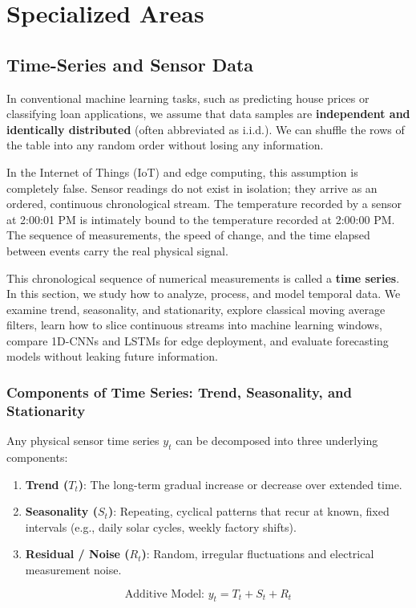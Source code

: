\chapter{Specialized Areas}\label{ch:specialized_areas}
\section{Time-Series and Sensor Data}\label{sec:time_series}

In conventional machine learning tasks, such as predicting house prices or classifying loan applications, we assume that data samples are \textbf{independent and identically distributed} (often abbreviated as i.i.d.). We can shuffle the rows of the table into any random order without losing any information.

In the Internet of Things (IoT) and edge computing, this assumption is completely false. Sensor readings do not exist in isolation; they arrive as an ordered, continuous chronological stream. The temperature recorded by a sensor at 2:00:01 PM is intimately bound to the temperature recorded at 2:00:00 PM. The sequence of measurements, the speed of change, and the time elapsed between events carry the real physical signal.

This chronological sequence of numerical measurements is called a \textbf{time series}. In this section, we study how to analyze, process, and model temporal data. We examine trend, seasonality, and stationarity, explore classical moving average filters, learn how to slice continuous streams into machine learning windows, compare 1D-CNNs and LSTMs for edge deployment, and evaluate forecasting models without leaking future information.

\subsection{Components of Time Series: Trend, Seasonality, and Stationarity}

\begin{keyidea}
Any physical sensor time series $y_t$ can be decomposed into three underlying components:
\begin{enumerate}
    \item \textbf{Trend ($T_t$)}: The long-term gradual increase or decrease over extended time.
    \item \textbf{Seasonality ($S_t$)}: Repeating, cyclical patterns that recur at known, fixed intervals (e.g., daily solar cycles, weekly factory shifts).
    \item \textbf{Residual / Noise ($R_t$)}: Random, irregular fluctuations and electrical measurement noise.
\end{enumerate}
\begin{equation}
\text{Additive Model: } y_t = T_t + S_t + R_t\label{eq:additive_decomp}
\end{equation}
\end{keyidea}

